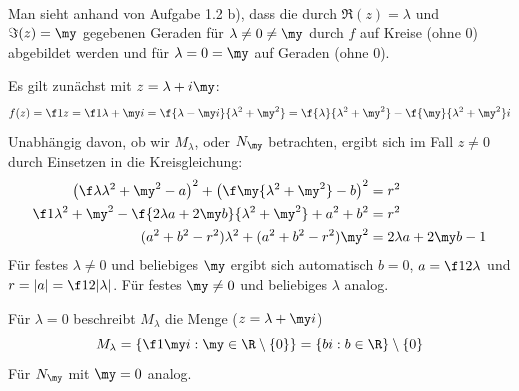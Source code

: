 \documentclass{mywork}
\begin{document}
	\setcounter{section}{1}
	\begin{aufgabe}~

		Man sieht anhand von Aufgabe 1.2 b), dass die durch $\Re(z)=\lambda$ und $\Im(z)=\my$ gegebenen Geraden für $\lambda\neq0\neq\my$ durch $f$ auf Kreise (ohne $0$) abgebildet werden und für $\lambda=0=\my$ auf Geraden (ohne $0$).

		Es gilt zunächst mit $z=\lambda + i\my$:
		\[
			f(z) = \f 1z = \f 1{\lambda+\my i} = \f {\lambda -\my i}{\lambda^2+\my^2}= \f{\lambda}{\lambda^2+\my^2} - \f{\my}{\lambda^2+\my^2}i
		\]
		Unabhängig davon, ob wir $M_\lambda$, oder $N_\my$ betrachten, ergibt sich im Fall $z\neq 0$ durch Einsetzen in die Kreisgleichung:
		\begin{align*}
			\left(\f \lambda{\lambda^2+\my^2}-a\right)^2 + \left(\f \my{\lambda^2+\my^2}-b\right)^2&=r^2\\
			   \f 1{\lambda^2+\my^2} - \f {2\lambda a+2\my b}{\lambda^2 +\my^2} + a^2 + b^2 &= r^2\\
												(a^2+b^2-r^2)\lambda^2 + (a^2+b^2-r^2)\my^2 &= 2\lambda a + 2\my b - 1
		\end{align*}
		Für festes $\lambda\neq 0$ und beliebiges $\my$ ergibt sich automatisch $b=0$, $a=\f 1{2\lambda}$ und $r=|a|=\f1{2|\lambda|}$. Für festes $\my\neq 0$ und beliebiges $\lambda$ analog.

		Für $\lambda=0$ beschreibt $M_\lambda$ die Menge ($z=\lambda+\my i$)
		\[
			M_\lambda = \left\{\f 1{\my i} : \my\in \R\setminus \{0\}\right\} = \{ b i : b\in \R\} \setminus \{0\}
		\]
		Für $N_\my$ mit $\my=0$ analog.


\end{aufgabe}
\end{document}
